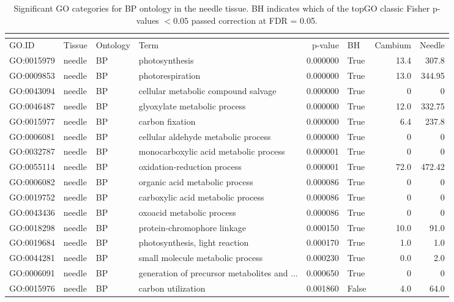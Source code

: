 \begin{longtable}{llllrlrr}
\caption{Significant GO categories for BP ontology in the needle tissue. BH indicates which of the topGO classic Fisher p-values $< 0.05$ passed correction at FDR = 0.05.}\\
\label{tab:go-needle-BP}\\
\toprule
GO.ID & Tissue & Ontology & Term & p-value & BH & Cambium & Needle \\
\midrule
GO:0015979 & needle & BP &   photosynthesis  & 0.000000 &   True  & 13.4 & 307.8 \\ 
GO:0009853 & needle & BP &   photorespiration  & 0.000000 &   True  & 13.0 & 344.95 \\ 
GO:0043094 & needle & BP &   cellular metabolic compound salvage  & 0.000000 &   True  & 0 & 0 \\
GO:0046487 & needle & BP &   glyoxylate metabolic process  & 0.000000 &   True  & 12.0 & 332.75 \\ 
GO:0015977 & needle & BP &   carbon fixation  & 0.000000 &   True  & 6.4 & 237.8 \\ 
GO:0006081 & needle & BP &   cellular aldehyde metabolic process  & 0.000000 &   True  & 0 & 0 \\
GO:0032787 & needle & BP &   monocarboxylic acid metabolic process  & 0.000001 &   True  & 0 & 0 \\
GO:0055114 & needle & BP &   oxidation-reduction process  & 0.000001 &   True  & 72.0 & 472.42 \\ 
GO:0006082 & needle & BP &   organic acid metabolic process  & 0.000086 &   True  & 0 & 0 \\
GO:0019752 & needle & BP &   carboxylic acid metabolic process  & 0.000086 &   True  & 0 & 0 \\
GO:0043436 & needle & BP &   oxoacid metabolic process  & 0.000086 &   True  & 0 & 0 \\
GO:0018298 & needle & BP &   protein-chromophore linkage  & 0.000150 &   True  & 10.0 & 91.0 \\ 
GO:0019684 & needle & BP &   photosynthesis, light reaction  & 0.000170 &   True  & 1.0 & 1.0 \\ 
GO:0044281 & needle & BP &   small molecule metabolic process  & 0.000230 &   True  & 0.0 & 2.0 \\ 
GO:0006091 & needle & BP &   generation of precursor metabolites and ...  & 0.000650 &   True  & 0 & 0 \\
GO:0015976 & needle & BP &   carbon utilization  & 0.001860 &   False  & 4.0 & 64.0 \\ 

\end{longtable}
